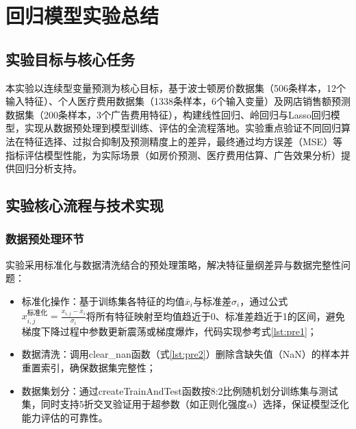 \clearpage
\section{回归模型实验总结}
\subsection{实验目标与核心任务}
本实验以连续型变量预测为核心目标，基于波士顿房价数据集（506条样本，12个输入特征）、个人医疗费用数据集（1338条样本，6个输入变量）及网店销售额预测数据集（200条样本，3个广告费用特征），构建线性回归、岭回归与Lasso回归模型，实现从数据预处理到模型训练、评估的全流程落地。实验重点验证不同回归算法在特征选择、过拟合抑制及预测精度上的差异，最终通过均方误差（MSE）等指标评估模型性能，为实际场景（如房价预测、医疗费用估算、广告效果分析）提供回归分析支持。

\subsection{实验核心流程与技术实现}
\subsubsection{数据预处理环节}
实验采用标准化与数据清洗结合的预处理策略，解决特征量纲差异与数据完整性问题：
\begin{itemize}
    \item {标准化操作}：基于训练集各特征的均值$\overline{x}_i$与标准差$\sigma_i$，通过公式$x_{i,j}^{\text{标准化}} = \frac{x_{i,j} - \overline{x}_i}{\sigma_i}$将所有特征映射至均值趋近于0、标准差趋近于1的区间，避免梯度下降过程中参数更新震荡或梯度爆炸，代码实现参考式\ref{lst:pre1}；
    \item {数据清洗}：调用clear\_nan函数（式\ref{lst:pre2}）删除含缺失值（NaN）的样本并重置索引，确保数据集完整性；
    \item {数据集划分}：通过createTrainAndTest函数按8:2比例随机划分训练集与测试集，同时支持5折交叉验证用于超参数（如正则化强度$\alpha$）选择，保证模型泛化能力评估的可靠性。
\end{itemize}

